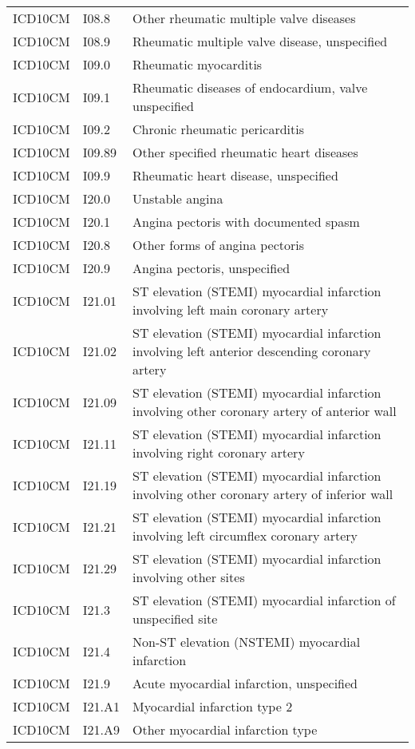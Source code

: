 \begin{longtable}{p{}p{}p{}}
  ICD10CM & I08.8 & Other rheumatic multiple valve diseases \\ 
  ICD10CM & I08.9 & Rheumatic multiple valve disease, unspecified \\ 
  ICD10CM & I09.0 & Rheumatic myocarditis \\ 
  ICD10CM & I09.1 & Rheumatic diseases of endocardium, valve unspecified \\ 
  ICD10CM & I09.2 & Chronic rheumatic pericarditis \\ 
  ICD10CM & I09.89 & Other specified rheumatic heart diseases \\ 
  ICD10CM & I09.9 & Rheumatic heart disease, unspecified \\ 
  ICD10CM & I20.0 & Unstable angina \\ 
  ICD10CM & I20.1 & Angina pectoris with documented spasm \\ 
  ICD10CM & I20.8 & Other forms of angina pectoris \\ 
  ICD10CM & I20.9 & Angina pectoris, unspecified \\ 
  ICD10CM & I21.01 & ST elevation (STEMI) myocardial infarction involving left main coronary artery \\ 
  ICD10CM & I21.02 & ST elevation (STEMI) myocardial infarction involving left anterior descending coronary artery \\ 
  ICD10CM & I21.09 & ST elevation (STEMI) myocardial infarction involving other coronary artery of anterior wall \\ 
  ICD10CM & I21.11 & ST elevation (STEMI) myocardial infarction involving right coronary artery \\ 
  ICD10CM & I21.19 & ST elevation (STEMI) myocardial infarction involving other coronary artery of inferior wall \\ 
  ICD10CM & I21.21 & ST elevation (STEMI) myocardial infarction involving left circumflex coronary artery \\ 
  ICD10CM & I21.29 & ST elevation (STEMI) myocardial infarction involving other sites \\ 
  ICD10CM & I21.3 & ST elevation (STEMI) myocardial infarction of unspecified site \\ 
  ICD10CM & I21.4 & Non-ST elevation (NSTEMI) myocardial infarction \\ 
  ICD10CM & I21.9 & Acute myocardial infarction, unspecified \\ 
  ICD10CM & I21.A1 & Myocardial infarction type 2 \\ 
  ICD10CM & I21.A9 & Other myocardial infarction type \\ 

\end{longtable}
